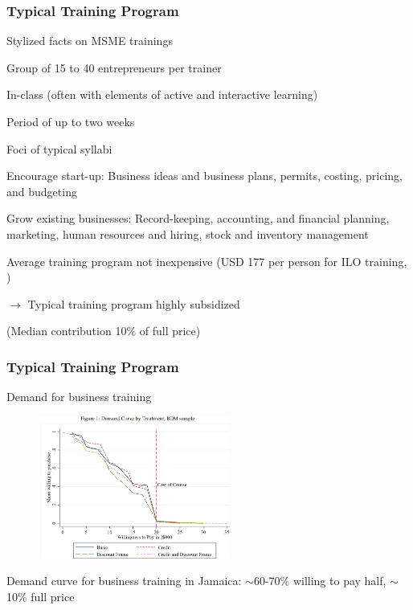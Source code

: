 \documentclass[hideothersubsections, usenames,dvipsnames,11pt]{beamer}
\newenvironment{itemize_2pt}{\itemize\addtolength{\itemsep}{2pt}}{\enditemize}
\begin{document}

\begin{frame}
\frametitle{Typical Training Program}
Stylized facts on MSME trainings
\begin{itemize_2pt}
	\item Group of 15 to 40 entrepreneurs per trainer
	\item In-class (often with elements of active and interactive learning)
	\item Period of up to two weeks	
	\item Foci of typical syllabi
	\begin{itemize_2pt}
		\item \textcolor{bdf}{Encourage start-up}: Business ideas and business plans, permits, costing, pricing, and budgeting
		\item \textcolor{bdf}{Grow existing businesses}: Record-keeping, accounting, and financial planning, marketing, human resources and hiring, stock and inventory management
	\end{itemize_2pt}
	
	\item Average training program not inexpensive (USD 177 per person for ILO training, \citet{vanLieshout2017})
	\item[] $\rightarrow$ Typical training program \textcolor{bdf}{highly subsidized}
	\item[] \quad (Median contribution 10\% of full price)
	
\end{itemize_2pt}

\end{frame}


\begin{frame}
\frametitle{Typical Training Program}
	
Demand for business training
	
\begin{figure}[htbp]
	\centering
	\includegraphics[width=17em]{pics/Maffioli2020_demand.png}
	\label{Maffioli(2020): Demand}
\end{figure}

\begin{itemize_2pt}
	\item Demand curve for business training in Jamaica: $\sim$60-70\% willing to pay half, $\sim$10\% full price \citep{Maffioli2020}
\end{itemize_2pt}

\end{frame}
\end{document}
